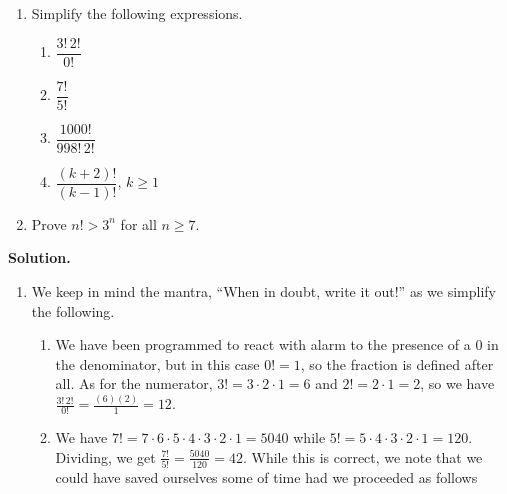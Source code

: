 \begin{ex}  \label{factorialex}  $~$

\begin{enumerate} 

\item  Simplify the following expressions.

\begin{multicols}{4}

\begin{enumerate}

\item  $\dfrac{3! \, 2!}{0!}$

\item  $\dfrac{7!}{5!}$

\item  $\dfrac{1000!}{998! \, 2!}$

\item  $\dfrac{(k+2)!}{(k-1)!}$, $k \geq 1$

\end{enumerate}

\end{multicols}

\item  Prove $n! > 3^n$ for all $n \geq 7$.

\end{enumerate}

{\bf Solution.}  

\begin{enumerate}

\item  We keep in mind the mantra, ``When in doubt, write it out!'' as we simplify the following.

\begin{enumerate}

\item  We have been programmed to react with alarm to the presence of a $0$ in the denominator, but in this case $0! = 1$, so the fraction is defined after all.  As for the numerator, $3! = 3 \cdot 2 \cdot 1 = 6$ and $2! = 2 \cdot 1 = 2$, so we have $\frac{3! \, 2!}{0!} = \frac{(6)(2)}{1} = 12$.

\item We have $7! = 7 \cdot 6 \cdot 5 \cdot 4 \cdot 3 \cdot 2 \cdot 1 = 5040$ while $5! = 5 \cdot 4 \cdot 3 \cdot 2 \cdot 1 = 120$.  Dividing, we get $\frac{7!}{5!} = \frac{5040}{120} = 42$.  While this is correct, we note that we could have saved ourselves some of time had we proceeded as follows


\end{enumerate}
\end{enumerate}
\end{ex}
